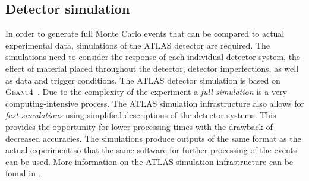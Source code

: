 

\subsection{Detector simulation}
In order to generate full Monte Carlo events that can be compared to actual experimental data, simulations of the ATLAS detector are required.
The simulations need to consider the response of each individual detector system, the effect of material placed throughout the detector, detector imperfections, as well as data and trigger conditions.
The ATLAS detector simulation is based on \textsc{Geant4}~\cite{Agostinelli:2002hh}.
Due to the complexity of the experiment a \emph{full simulation} is a very computing-intensive process. The ATLAS simulation infrastructure also allows for \emph{fast simulations} using simplified descriptions of the detector systems. This provides the opportunity for lower processing times with the drawback of decreased accuracies.
The simulations produce outputs of the same format as the actual experiment so that the same software for further processing of the events can be used.
More information on the ATLAS simulation infrastructure can be found in .



